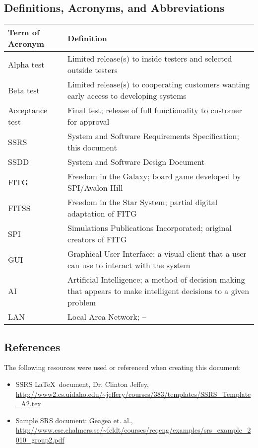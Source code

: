 \documentclass[twoside,letterpaper]{article}
\begin{document}
\subsection{Definitions, Acronyms, and Abbreviations}

\begin{minipage}{\linewidth}
\centering
\begin{tabularx}{\textwidth}{lX}\toprule[1.5pt] %

\bf Term of Acronym & \bf Definition\\ \midrule[1.0pt]

Alpha test & Limited release(s) to inside testers and selected outside testers\\
Beta test & Limited release(s) to cooperating customers wanting early access to developing systems\\
Acceptance test & Final test; release of full functionality to customer for approval\\
SSRS & System and Software Requirements Specification; this document\\
SSDD & System and Software Design Document\\
FITG & Freedom in the Galaxy; board game developed by SPI/Avalon Hill\\
FITSS & Freedom in the Star System; partial digital adaptation of FITG\\
SPI & Simulations Publications Incorporated; original creators of FITG\\
GUI & Graphical User Interface; a visual client that a user can use to interact with the system\\
AI & Artificial Intelligence; a method of decision making that appears to make intelligent decisions to a given problem\\
LAN & Local Area Network; --\\

\bottomrule[1.5pt]
\end{tabularx}
\end{minipage}


\subsection{References}
The following resources were used or referenced when creating this document:
\begin{itemize}
	\item SSRS \LaTeX\ document, Dr. Clinton Jeffey, \url{http://www2.cs.uidaho.edu/~jeffery/courses/383/templates/SSRS_Template_A2.tex}
	\item Sample SRS document: Geagea et. al., \url{http://www.cse.chalmers.se/~feldt/courses/reqeng/examples/srs_example_2010_group2.pdf}
\end{itemize}
\end{document}
